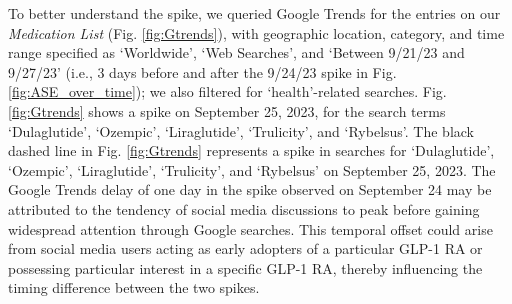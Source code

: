 \documentclass[referee,bst/sn-basic]{sn-jnl}%
\theoremstyle{thmstyletwo}%
\theoremstyle{thmstylethree}%
\begin{document}
\begin{comment}
\begin{table}[h]
    \centering
    \caption{Frequency of adverse side effect (ASE) mentions before and after the observed spike in mentions.}
    \begin{tabular}{llll}
    \toprule
                Adverse Side Effect   & Pre-MAF & Post-MAF & Slope\\
                \midrule
                Anxiety & 18.0& 20.0 & +\\
                Constipation& 29.0& 35.0 & +\\
                Depression& 15.5& 15.5 & 0 \\
                Fatigue& 17.6& 14.6 & -\\
                Nausea& 39.1& 57.8 & +\\
                Pain (abdominal pain, back pain) & 20.5& 36.0 & +\\
                Vomiting& 20.5& 27.0 & +\\
    \bottomrule
    \end{tabular}
    NA - Fewer than 10 mentions were observed either before or after the spike (September 24, 2023), as indicated in Fig. \ref{fig:ASE_over_time}.
    \label{tbl:freq_before_after}
\end{table}
\end{comment}
  

To better understand the spike, we queried Google Trends for the entries on our \textit{Medication List} (Fig. \ref{fig:Gtrends}), with geographic location, category, and time range specified as `Worldwide', `Web Searches', and `Between 9/21/23 and 9/27/23' (i.e., 3 days before and after the 9/24/23 spike in Fig. \ref{fig:ASE_over_time}); we also filtered for `health'-related searches. 
Fig. \ref{fig:Gtrends} shows a spike on September 25, 2023, for the search terms `Dulaglutide', `Ozempic', `Liraglutide', `Trulicity', and `Rybelsus'.
The black dashed line in Fig. \ref{fig:Gtrends} represents a spike in searches for `Dulaglutide', `Ozempic', `Liraglutide', `Trulicity', and `Rybelsus' on September 25, 2023.
The Google Trends delay of one day in the spike observed on September 24 may be attributed to the tendency of social media discussions to peak before gaining widespread attention through Google searches.
This temporal offset could arise from social media users acting as early adopters of a particular GLP-1 RA or possessing particular interest in a specific GLP-1 RA, thereby influencing the timing difference between the two spikes.
\end{document}
